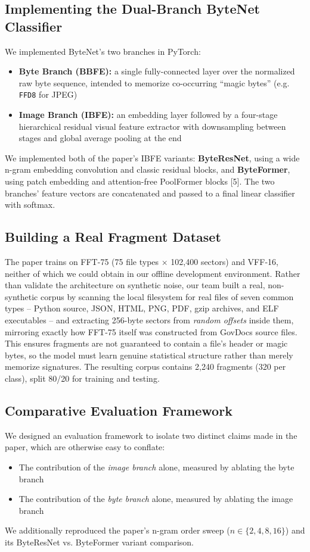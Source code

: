 \documentclass[conference]{IEEEtran}
\begin{document}
{\subsection{Implementing the Dual-Branch ByteNet Classifier}
We implemented ByteNet's two branches in PyTorch:
\begin{itemize}[leftmargin=1em, itemsep=0pt]
\item \textbf{Byte Branch (BBFE):} a single fully-connected layer over the normalized raw byte sequence, intended to memorize co-occurring ``magic bytes'' (e.g. \texttt{FFD8} for JPEG)
\item \textbf{Image Branch (IBFE):} an embedding layer followed by a four-stage hierarchical residual visual feature extractor with downsampling between stages and global average pooling at the end
\end{itemize}
We implemented both of the paper's IBFE variants: \textbf{ByteResNet}, using a wide n-gram embedding convolution and classic residual blocks, and \textbf{ByteFormer}, using patch embedding and attention-free PoolFormer blocks [5]. The two branches' feature vectors are concatenated and passed to a final linear classifier with softmax.

\subsection{Building a Real Fragment Dataset}
\label{sec:dataset}
The paper trains on FFT-75 (75 file types $\times$ 102{,}400 sectors) and VFF-16, neither of which we could obtain in our offline development environment. Rather than validate the architecture on synthetic noise, our team built a real, non-synthetic corpus by scanning the local filesystem for real files of seven common types -- Python source, JSON, HTML, PNG, PDF, gzip archives, and ELF executables -- and extracting 256-byte sectors from \emph{random offsets} inside them, mirroring exactly how FFT-75 itself was constructed from GovDocs source files. This ensures fragments are not guaranteed to contain a file's header or magic bytes, so the model must learn genuine statistical structure rather than merely memorize signatures. The resulting corpus contains 2{,}240 fragments (320 per class), split 80/20 for training and testing.

\subsection{Comparative Evaluation Framework}
We designed an evaluation framework to isolate two distinct claims made in the paper, which are otherwise easy to conflate:
\begin{itemize}[leftmargin=1em, itemsep=0pt]
\item The contribution of the \emph{image branch} alone, measured by ablating the byte branch
\item The contribution of the \emph{byte branch} alone, measured by ablating the image branch
\end{itemize}
We additionally reproduced the paper's n-gram order sweep ($n \in \{2, 4, 8, 16\}$) and its ByteResNet vs. ByteFormer variant comparison.

}
\end{document}

